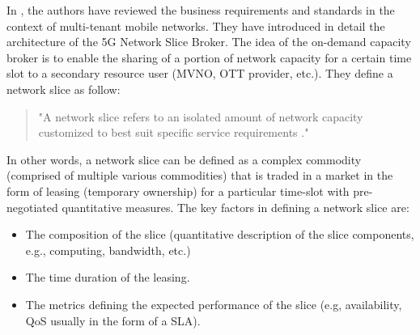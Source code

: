 In \cite{7514161}, the authors have reviewed the business requirements and standards in the context of multi-tenant mobile networks. They have introduced in detail the architecture of the 5G Network Slice Broker. The idea of the on-demand capacity broker is to enable the sharing of a portion of network capacity for a certain time slot to a secondary resource user (MVNO, OTT provider, etc.). They define a network slice as follow:
\begin{quote}
    "A network slice refers to an isolated amount of network capacity customized to best suit specific service requirements \cite{7514161}."
\end{quote}
In other words, a network slice can be defined as a complex commodity (comprised of multiple various commodities) that is traded in a market in the form of leasing (temporary ownership) for a particular time-slot with pre-negotiated quantitative measures. The key factors in defining a network slice are:
\begin{itemize}
    \item The composition of the slice (quantitative description of the slice components, e.g., computing, bandwidth, etc.)
    \item The time duration of the leasing.
    \item The metrics defining the expected performance of the slice (e.g, availability, \ac{QoS} usually in the form of a \ac{SLA}).
\end{itemize}







